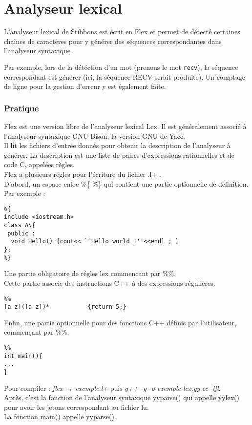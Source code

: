 \section{Analyseur lexical}

L'analyseur lexical de Stibbons est écrit en Flex et permet de détecté certaines chaînes de caractères pour y générer des séquences correspondantes dans l'analyseur syntaxique.

Par exemple, lors de la détéction d'un mot (prenons le mot \verb|recv|), la séquence correspondant est générer (ici, la séquence RECV serait produite).
Un comptage de ligne pour la gestion d'erreur y est également faite.

\subsubsection{Pratique}
Flex est une version libre de l'analyseur lexical Lex. Il est généralement associé à l'analyseur syntaxique GNU Bison, la version GNU de Yacc. \\
Il lit les fichiers d'entrée donnés pour obtenir la description de l'analyseur à générer. La description est une liste de paires d'expressions rationnelles et de code C, appelées règles. \\
Flex a plusieurs régles pour l'écriture du fichier .l+ .\\
D'abord, un espace entre \%\{ \%\} qui contient une partie optionnelle de définition.\\
Par exemple :
\ \begin{verbatim}
%{
include <iostream.h>
class A\{ 
 public :
  void Hello() {cout<< ``Hello world !''<<endl ; }
};
%}
\end{verbatim}
Une partie obligatoire de régles lex commencant par \%\%.\\
Cette partie associe des instructions C++ à des expressions régulières.
\begin{verbatim}
%%
[a-z]([a-z])*           {return 5;}
\end{verbatim}
Enfin, une partie optionnelle pour des fonctions C++ définis par l'utilisateur, commençant par \%\%.\\
\begin{verbatim}
%%
int main(){
...
}
\end{verbatim}
Pour compiler : \textit{flex -+ exemple.l+}  puis \textit{g++ -g -o exemple lex.yy.cc -lfl}.\\
Après, c'est la fonction de l'analyseur syntaxique yyparse() qui appelle yylex() pour avoir les jetons correspondant au fichier lu.\\
La fonction main() appelle yyparse().\\
